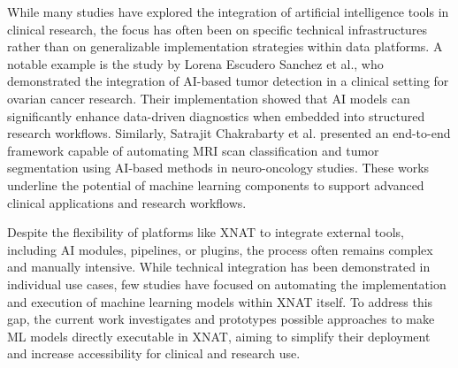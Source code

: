 While many studies have explored the integration of artificial intelligence tools in clinical research, the focus has often been on specific technical infrastructures rather than on generalizable implementation strategies within data platforms. A notable example is the study by Lorena Escudero Sanchez et al.\cite{escudero_sanchez_integrating_2023}, who demonstrated the integration of AI-based tumor detection in a clinical setting for ovarian cancer research. Their implementation showed that AI models can significantly enhance data-driven diagnostics when embedded into structured research workflows. Similarly, Satrajit Chakrabarty et al.\cite{chakrabarty_deep_2023} presented an end-to-end framework capable of automating \ac{MRI} scan classification and tumor segmentation using AI-based methods in neuro-oncology studies. These works underline the potential of machine learning components to support advanced clinical applications and research workflows.

Despite the flexibility of platforms like XNAT to integrate external tools, including AI modules, pipelines, or plugins, the process often remains complex and manually intensive. While technical integration has been demonstrated in individual use cases, few studies have focused on automating the implementation and execution of machine learning models within XNAT itself. To address this gap, the current work investigates and prototypes possible approaches to make \ac{ML} models directly executable in XNAT, aiming to simplify their deployment and increase accessibility for clinical and research use.









 

